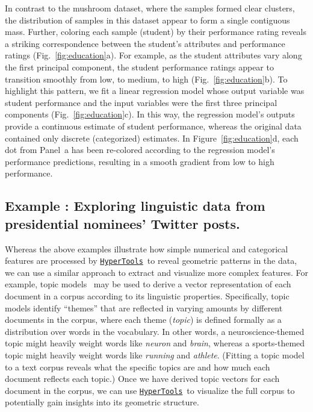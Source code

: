 \documentclass[12pt,letterpaper]{article}
\newcommand{\hypertools}{\href{https://github.com/ContextLab/hypertools}{\texttt{HyperTools}}}
\newcounter{example}
\begin{document}
In contrast to the mushroom dataset, where the samples formed clear clusters, the distribution of samples in this dataset appear to form a single contiguous mass.  Further, coloring each sample (student) by their performance rating reveals a striking correspondence between the student's attributes and performance ratings (Fig.~\ref{fig:education}a).  For example, as the student attributes vary along the first principal component, the student performance ratings appear to transition smoothly from low, to medium, to high (Fig.~\ref{fig:education}b).  To highlight this pattern, we fit a linear regression model whose output variable was student performance and the input variables were the first three principal components (Fig.~\ref{fig:education}c).  In this way, the regression model's outputs provide a continuous estimate of student performance, whereas the original data contained only discrete (categorized) estimates.  In Figure~\ref{fig:education}d, each dot from Panel~a has been re-colored according to the regression model's performance predictions, resulting in a smooth gradient from low to high performance.







\subsection*{Example : Exploring linguistic data from presidential nominees' Twitter posts.}
Whereas the above examples illustrate how simple numerical and categorical features are processed by \hypertools~to reveal geometric patterns in the data, we can use a similar approach to extract and visualize more complex features.  For example, topic models~\cite{BleiEtal03} may be used to derive a vector representation of each document in a corpus according to its linguistic properties.  Specifically, topic models identify ``themes'' that are reflected in varying amounts by different documents in the corpus, where each theme (\textit{topic}) is defined formally as a distribution over words in the vocabulary.  In other words, a neuroscience-themed topic might heavily weight words like \textit{neuron} and \textit{brain}, whereas a sports-themed topic might heavily weight words like \textit{running} and \textit{athlete}.  (Fitting a topic model to a text corpus reveals what the specific topics are and how much each document reflects each topic.)  Once we have derived topic vectors for each document in the corpus, we can use \hypertools~to visualize the full corpus to potentially gain insights into its geometric structure.
\end{document}
